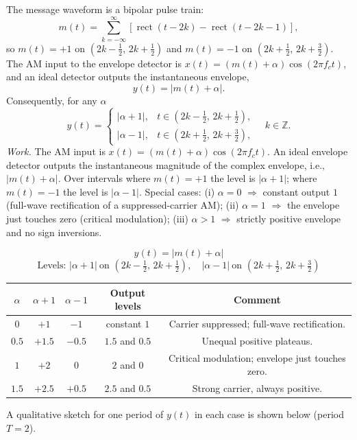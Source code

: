 \documentclass[12pt]{article}
\newcommand{\answer}[1]{\boxed{\;#1\;}}
\begin{document}
The message waveform is a bipolar pulse train:
\[
  m(t) = \sum_{k=-\infty}^{\infty}\left[\operatorname{rect}(t-2k) - \operatorname{rect}(t-2k-1)\right],
\]
so $m(t)=+1$ on $(2k-\tfrac{1}{2},\,2k+\tfrac{1}{2})$ and $m(t)=-1$ on $(2k+\tfrac{1}{2},\,2k+\tfrac{3}{2})$.  The AM input to the envelope detector is $x(t) = (m(t)+\alpha)\cos(2\pi f_c t)$, and an ideal detector outputs the instantaneous envelope,
\[
  y(t) = |m(t) + \alpha|.
\]
Consequently, for any $\alpha$
\[
  y(t) =
  \begin{cases}
    |\alpha + 1|, & t \in (2k-\tfrac{1}{2},\,2k+\tfrac{1}{2}),\\
    |\alpha - 1|, & t \in (2k+\tfrac{1}{2},\,2k+\tfrac{3}{2}),
  \end{cases}
\quad k \in \mathbb{Z}.
\]
\emph{Work.} The AM input is \(x(t)=(m(t)+\alpha)\cos(2\pi f_c t)\). An ideal envelope detector outputs the instantaneous magnitude of the complex envelope, i.e., \(|m(t)+\alpha|\). Over intervals where \(m(t)=+1\) the level is \(|\alpha+1|\); where \(m(t)=-1\) the level is \(|\alpha-1|\). Special cases:
(i) \(\alpha=0\) \(\Rightarrow\) constant output \(1\) (full-wave rectification of a suppressed-carrier AM);
(ii) \(\alpha=1\) \(\Rightarrow\) the envelope just touches zero (critical modulation);
(iii) \(\alpha>1\) \(\Rightarrow\) strictly positive envelope and no sign inversions.

\[
  \answer{y(t)=|m(t)+\alpha|}
\]
\[
  \answer{\text{Levels: }|\alpha+1|\ \text{on }(2k-\tfrac{1}{2},\,2k+\tfrac{1}{2}),\quad |\alpha-1|\ \text{on }(2k+\tfrac{1}{2},\,2k+\tfrac{3}{2})}
\]

\begin{center}
  \begin{tabular}{@{}ccccc@{}}
    \toprule
    $\alpha$ & $\alpha + 1$ & $\alpha - 1$ & Output levels & Comment \\
    \midrule
    $0$   & $+1$ & $-1$  & constant $1$ & Carrier suppressed; full-wave rectification. \\
    $0.5$ & $+1.5$ & $-0.5$ & $1.5$ and $0.5$ & Unequal positive plateaus. \\
    $1$   & $+2$ & $0$    & $2$ and $0$ & Critical modulation; envelope just touches zero. \\
    $1.5$ & $+2.5$ & $+0.5$ & $2.5$ and $0.5$ & Strong carrier, always positive. \\
    \bottomrule
  \end{tabular}
\end{center}

A qualitative sketch for one period of $y(t)$ in each case is shown below (period $T=2$).
\end{document}
